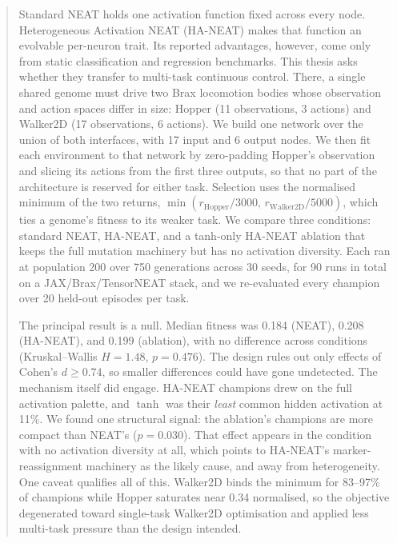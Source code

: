 \documentclass[12pt]{article}
\begin{document}
\begin{abstract}
\noindent
Standard NEAT holds one activation function fixed across every node. Heterogeneous Activation NEAT (HA-NEAT) makes that function an evolvable per-neuron trait. Its reported advantages, however, come only from static classification and regression benchmarks. This thesis asks whether they transfer to multi-task continuous control. There, a single shared genome must drive two Brax locomotion bodies whose observation and action spaces differ in size: Hopper (11 observations, 3 actions) and Walker2D (17 observations, 6 actions). We build one network over the union of both interfaces, with 17 input and 6 output nodes. We then fit each environment to that network by zero-padding Hopper's observation and slicing its actions from the first three outputs, so that no part of the architecture is reserved for either task. Selection uses the normalised minimum of the two returns, $\min(r_{\text{Hopper}}/3000,\, r_{\text{Walker2D}}/5000)$, which ties a genome's fitness to its weaker task. We compare three conditions: standard NEAT, HA-NEAT, and a tanh-only HA-NEAT ablation that keeps the full mutation machinery but has no activation diversity. Each ran at population 200 over 750 generations across 30 seeds, for 90 runs in total on a JAX/Brax/TensorNEAT stack, and we re-evaluated every champion over 20 held-out episodes per task.

The principal result is a null. Median fitness was 0.184 (NEAT), 0.208 (HA-NEAT), and 0.199 (ablation), with no difference across conditions (Kruskal--Wallis $H = 1.48$, $p = 0.476$). The design rules out only effects of Cohen's $d \geq 0.74$, so smaller differences could have gone undetected. The mechanism itself did engage. HA-NEAT champions drew on the full activation palette, and $\tanh$ was their \emph{least} common hidden activation at 11\%. We found one structural signal: the ablation's champions are more compact than NEAT's ($p = 0.030$). That effect appears in the condition with no activation diversity at all, which points to HA-NEAT's marker-reassignment machinery as the likely cause, and away from heterogeneity. One caveat qualifies all of this. Walker2D binds the minimum for 83--97\% of champions while Hopper saturates near 0.34 normalised, so the objective degenerated toward single-task Walker2D optimisation and applied less multi-task pressure than the design intended.
\end{abstract}

\newpage

\tableofcontents
\end{document}
